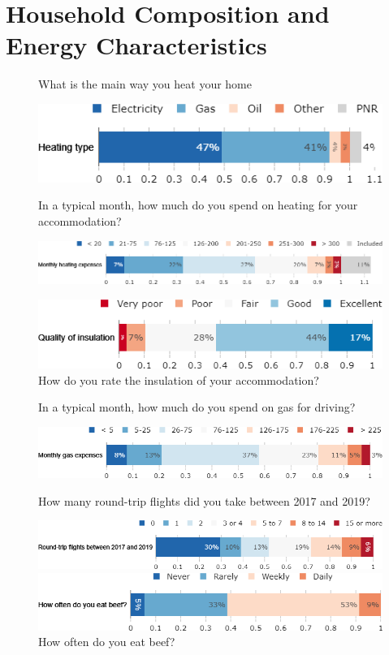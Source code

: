 \documentclass[aspectratio=169,9pt,dvipsnames]{beamer}
\begin{document}
\section{Household Composition and Energy Characteristics}
\begin{frame}{}%
\begin{figure}[h!]
\caption{What is the main way you heat your home}

\centering
\includegraphics[width=.5\textwidth]{../figures/US/heating_US.png} \\
\vspace{.5cm}
\caption{In a typical month, how much do you spend on heating for your accommodation?}
\includegraphics[width=.7\textwidth]{../figures/US/heating_expenses_US.png} \\
\vspace{.5cm}
\centering
\caption{How do you rate the insulation of your accommodation?}
\includegraphics[width=.6\textwidth]{../figures/US/insulation_US.png}
\end{figure}
\end{frame}

\begin{frame}{}%
\begin{figure}[h!]
\centering
\caption{In a typical month, how much do you spend on gas for driving?}
\includegraphics[width=.6\textwidth]{../figures/US/gas_expenses_US.png} \\
\vspace{.5cm}
\caption{How many round-trip flights did you take between 2017 and 2019?}
\includegraphics[width=.7\textwidth]{../figures/US/flights_3y_US.png}
\vspace{.5cm}
\caption{How often do you eat beef?}
\includegraphics[width=.7\textwidth]{../figures/US/frequency_beef_US.png}
\end{figure}
\end{frame}
\end{document}
